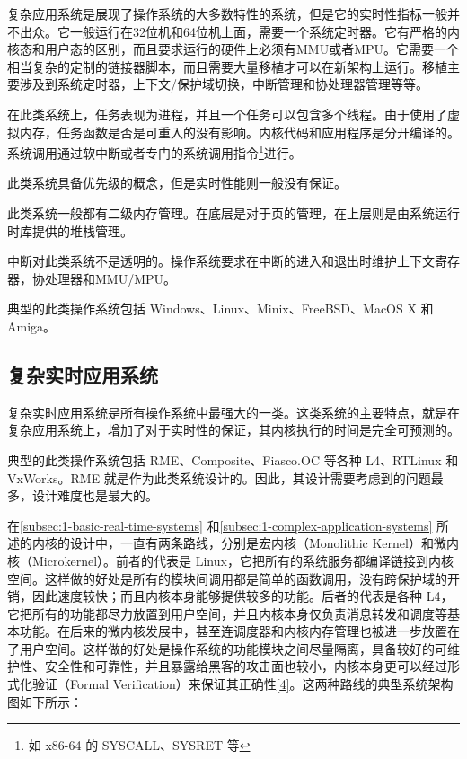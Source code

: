 复杂应用系统是展现了操作系统的大多数特性的系统，但是它的实时性指标一般并不出众。它一般运行在32位机和64位机上面，需要一个系统定时器。它有严格的内核态和用户态的区别，而且要求运行的硬件上必须有MMU或者MPU。它需要一个相当复杂的定制的链接器脚本，而且需要大量移植才可以在新架构上运行。移植主要涉及到系统定时器，上下文/保护域切换，中断管理和协处理器管理等等。

在此类系统上，任务表现为进程，并且一个任务可以包含多个线程。由于使用了虚拟内存，任务函数是否是可重入的没有影响。内核代码和应用程序是分开编译的。系统调用通过软中断或者专门的系统调用指令\footnote{如 x86-64 的 SYSCALL、SYSRET 等}进行。

此类系统具备优先级的概念，但是实时性能则一般没有保证。

此类系统一般都有二级内存管理。在底层是对于页的管理，在上层则是由系统运行时库提供的堆栈管理。

中断对此类系统不是透明的。操作系统要求在中断的进入和退出时维护上下文寄存器，协处理器和MMU/MPU。

典型的此类操作系统包括 Windows、Linux、Minix、FreeBSD、MacOS X 和 Amiga。

\subsection{复杂实时应用系统}\label{subsec:1-complex-real-time-application-systems}

复杂实时应用系统是所有操作系统中最强大的一类。这类系统的主要特点，就是在复杂应用系统上，增加了对于实时性的保证，其内核执行的时间是完全可预测的。

典型的此类操作系统包括 RME、Composite、Fiasco.OC 等各种 L4、RTLinux 和 VxWorks。RME 就是作为此类系统设计的。因此，其设计需要考虑到的问题最多，设计难度也是最大的。

在\ref{subsec:1-basic-real-time-systems}
和\ref{subsec:1-complex-application-systems}
所述的内核的设计中，一直有两条路线，分别是宏内核（Monolithic
Kernel）和微内核（Microkernel）。前者的代表是 Linux，它把所有的系统服务都编译链接到内核空间。这样做的好处是所有的模块间调用都是简单的函数调用，没有跨保护域的开销，因此速度较快；而且内核本身能够提供较多的功能。后者的代表是各种 L4，它把所有的功能都尽力放置到用户空间，并且内核本身仅负责消息转发和调度等基本功能。在后来的微内核发展中，甚至连调度器和内核内存管理也被进一步放置在了用户空间。这样做的好处是操作系统的功能模块之间尽量隔离，具备较好的可维护性、安全性和可靠性，并且暴露给黑客的攻击面也较小，内核本身更可以经过形式化验证（Formal
Verification）来保证其正确性\hyperref[cite:1-4]{{[}4{]}}。这两种路线的典型系统架构图如下所示：

